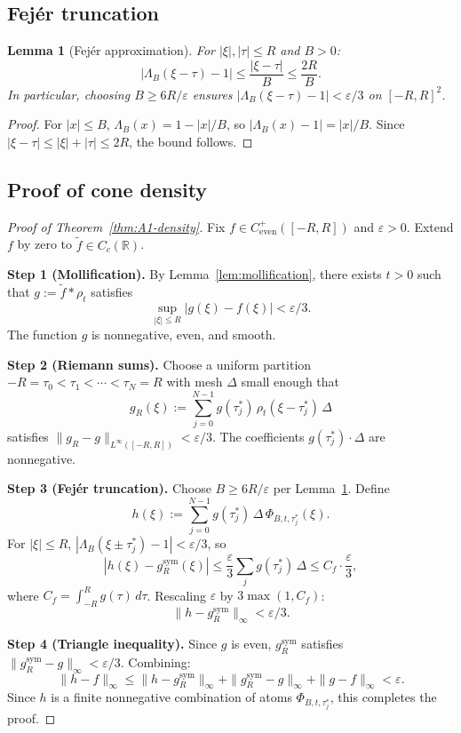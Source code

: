 \documentclass[11pt,a4paper]{article}
\newtheorem{lemma}[theorem]{Lemma}
\theoremstyle{definition}
\theoremstyle{remark}
\newcommand{\R}{\mathbb{R}}
\begin{document}
\subsection{Fej\'er truncation}

\begin{lemma}[Fej\'er approximation]\label{lem:fejer-approx}
For $|\xi|, |\tau| \leq R$ and $B > 0$:
\[
  |\Lambda_B(\xi - \tau) - 1| \leq \frac{|\xi - \tau|}{B} \leq \frac{2R}{B}.
\]
In particular, choosing $B \geq 6R/\varepsilon$ ensures $|\Lambda_B(\xi - \tau) - 1| < \varepsilon/3$ on $[-R, R]^2$.
\end{lemma}

\begin{proof}
For $|x| \leq B$, $\Lambda_B(x) = 1 - |x|/B$, so $|\Lambda_B(x) - 1| = |x|/B$. Since $|\xi - \tau| \leq |\xi| + |\tau| \leq 2R$, the bound follows.
\end{proof}

\subsection{Proof of cone density}

\begin{proof}[Proof of Theorem~\ref{thm:A1-density}]
Fix $f \in C^+_{\mathrm{even}}([-R, R])$ and $\varepsilon > 0$. Extend $f$ by zero to $\widetilde{f} \in C_c(\R)$.

\textbf{Step 1 (Mollification).} By Lemma~\ref{lem:mollification}, there exists $t > 0$ such that $g := \widetilde{f} * \rho_t$ satisfies
\[
  \sup_{|\xi| \leq R} |g(\xi) - f(\xi)| < \varepsilon/3.
\]
The function $g$ is nonnegative, even, and smooth.

\textbf{Step 2 (Riemann sums).} Choose a uniform partition $-R = \tau_0 < \tau_1 < \cdots < \tau_N = R$ with mesh $\Delta$ small enough that
\[
  g_R(\xi) := \sum_{j=0}^{N-1} g(\tau_j^*)\, \rho_t(\xi - \tau_j^*)\, \Delta
\]
satisfies $\|g_R - g\|_{L^\infty([-R,R])} < \varepsilon/3$. The coefficients $g(\tau_j^*) \cdot \Delta$ are nonnegative.

\textbf{Step 3 (Fej\'er truncation).} Choose $B \geq 6R/\varepsilon$ per Lemma~\ref{lem:fejer-approx}. Define
\[
  h(\xi) := \sum_{j=0}^{N-1} g(\tau_j^*)\, \Delta\, \Phi_{B,t,\tau_j^*}(\xi).
\]
For $|\xi| \leq R$, $|\Lambda_B(\xi \pm \tau_j^*) - 1| < \varepsilon/3$, so
\[
  |h(\xi) - g_R^{\mathrm{sym}}(\xi)| \leq \frac{\varepsilon}{3} \sum_j g(\tau_j^*)\, \Delta \leq C_f \cdot \frac{\varepsilon}{3},
\]
where $C_f = \int_{-R}^R g(\tau)\, d\tau$. Rescaling $\varepsilon$ by $3\max(1, C_f)$:
\[
  \|h - g_R^{\mathrm{sym}}\|_\infty < \varepsilon/3.
\]

\textbf{Step 4 (Triangle inequality).} Since $g$ is even, $g_R^{\mathrm{sym}}$ satisfies $\|g_R^{\mathrm{sym}} - g\|_\infty < \varepsilon/3$. Combining:
\[
  \|h - f\|_\infty \leq \|h - g_R^{\mathrm{sym}}\|_\infty + \|g_R^{\mathrm{sym}} - g\|_\infty + \|g - f\|_\infty < \varepsilon.
\]
Since $h$ is a finite nonnegative combination of atoms $\Phi_{B,t,\tau_j^*}$, this completes the proof.
\end{proof}
\end{document}
